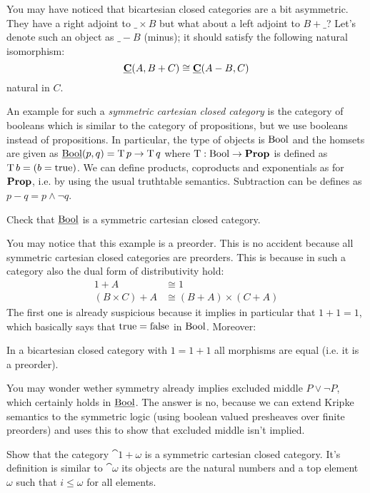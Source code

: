 You may have noticed that bicartesian closed categories are a bit asymmetric. They have a right adjoint to $\_\times B$ but what about a left adjoint to $B+\_$? Let's denote such an object as $\_- B$ (minus); it should satisfy the following natural isomorphism:
\[ \underline{\mathbf{C}}(A,B+C) \cong \underline{\mathbf{C}}(A - B,C) \]
natural in $C$. 

An example for such a \emph{symmetric cartesian closed category} is the category of booleans which is similar to the category of propositions, but we use booleans instead of propositions. In particular, the type of objects is $\mathrm{Bool}$ and the homsets are given as 
$\underline{\mathbf{\mathrm{Bool}}}(p,q) = \mathrm{T}\,p \to \mathrm{T}\,q$ where $\mathrm{T} : \mathrm{Bool} \to \mathbf{Prop}$ is defined as $\mathrm{T}\,b = (b = \mathrm{true})$. We can define products, coproducts and exponentials as for $\mathbf{Prop}$, i.e. by using the usual truthtable semantics. Subtraction can be defines as $p-q = p \wedge \neg q$.
\begin{Exercise}
  Check that $\underline{\mathbf{\mathrm{Bool}}}$ is a symmetric cartesian closed category.
\end{Exercise}
You may notice that this example is a preorder. This is no accident because all symmetric cartesian closed categories are preorders. This is because in such a category also the dual form of distributivity hold:
\begin{align*}
  1 +  A & \cong 1 \\
  (B \times C) + A & \cong (B + A) \times (C + A)
\end{align*}
The first one is already suspicious because it implies in particular that $1+1 = 1$, which basically says that $\mathrm{true} = \mathrm{false}$ in $\mathrm{Bool}$. Moreover:
\begin{Exercise}
  In a bicartesian closed category with $1 = 1+1$ all morphisms are equal (i.e. it is a preorder). 
\end{Exercise}
You may wonder wether symmetry already implies excluded middle $P \vee \neg P$, which certainly holds in $\underline{\mathbf{\mathrm{Bool}}}$. The answer is no, because we can extend Kripke semantics to the symmetric logic (using boolean valued presheaves over finite preorders) and uses this to show that excluded middle isn't implied. 

\begin{Exercise}
  Show that the category $\cat{1+\omega}$ is a symmetric cartesian closed category. It's definition is similar to $\cat{\omega}$ its objects are the natural numbers and a top element $\omega$ such that $i \leq \omega$ for all elements.
\end{Exercise}